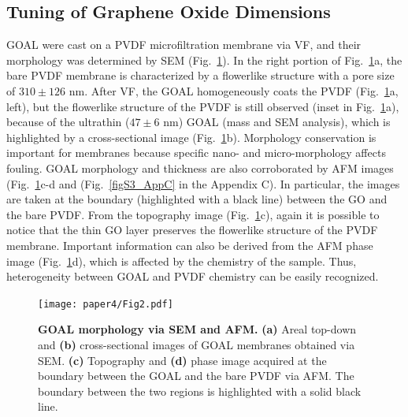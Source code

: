\subsection{Tuning of Graphene Oxide Dimensions}
GOAL were cast on a PVDF microfiltration membrane via VF, and their morphology was determined by SEM (Fig.~\ref{Fig2_pap4}). In the right portion of Fig.~\ref{Fig2_pap4}a, the bare PVDF membrane is characterized by a flowerlike structure with a pore size of $310\pm126$ nm. After VF, the GOAL homogeneously coats the PVDF (Fig.~\ref{Fig2_pap4}a, left), but the flowerlike structure of the PVDF is still observed (inset in Fig.~\ref{Fig2_pap4}a), because of the ultrathin ($47\pm6$ nm) GOAL (mass and SEM analysis), which is highlighted by a cross-sectional image (Fig.~\ref{Fig2_pap4}b). Morphology conservation is important for membranes because specific nano- and micro-morphology affects fouling.\cite{hu2016organic} GOAL morphology and thickness are also corroborated by AFM images (Fig.~\ref{Fig2_pap4}c-d and (Fig.~\ref{figS3_AppC} in the Appendix C). In particular, the images are taken at the boundary (highlighted with a black line) between the GO and the bare PVDF. From the topography image (Fig.~\ref{Fig2_pap4}c), again it is possible to notice that the thin GO layer preserves the flowerlike structure of the PVDF membrane. Important information can also be derived from the AFM phase image (Fig.~\ref{Fig2_pap4}d), which is affected by the chemistry of the sample.\cite{Paulo2002} Thus, heterogeneity between GOAL and PVDF chemistry can be easily recognized.\\
\begin{figure}[t!]
  \centering
  \texttt{[image: paper4/Fig2.pdf]}
  \caption{\textbf{GOAL morphology via SEM and AFM.} \textbf{(a)} Areal top-down and \textbf{(b)} cross-sectional images of GOAL membranes obtained via SEM. \textbf{(c)} Topography and \textbf{(d)} phase image acquired at the boundary between the GOAL and the bare PVDF via AFM. The boundary between the two regions is highlighted with a solid black line.}
  \label{Fig2_pap4}
\end{figure}
